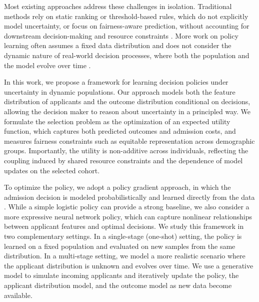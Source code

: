 \documentclass[acmlarge]{acmart-ecaf}
\begin{document}
Most existing approaches address these challenges in isolation. Traditional methods rely on static ranking or threshold-based rules, which do not explicitly model uncertainty, or focus on fairness-aware prediction, without accounting for downstream decision-making and resource constraints \cite{garnett2010bayesian, kleinberg2018algorithmic}. More work on policy learning often assumes a fixed data distribution and does not consider the dynamic nature of real-world decision processes, where both the population and the model evolve over time \cite{ athey2021policy, kleine2022meritocracy,gupta1958selecting}.

In this work, we propose a framework for learning decision policies under uncertainty in dynamic populations. Our approach models both the feature distribution of applicants and the outcome distribution conditional on decisions, allowing the decision maker to reason about uncertainty in a principled way. We formulate the selection problem as the optimization of an expected utility function, which captures both predicted outcomes and admission costs, and measures fairness constraints such as equitable representation across demographic groups. Importantly, the utility is non-additive across individuals, reflecting the coupling induced by shared resource constraints and the dependence of model updates on the selected cohort.

To optimize the policy, we adopt a policy gradient approach, in which the admission decision is modeled probabilistically and learned directly from the data \cite{wu2023predictive}. While a simple logistic policy can provide a strong baseline, we also consider a more expressive neural network policy, which can capture nonlinear relationships between applicant features and optimal decisions. We study this framework in two complementary settings. In a single-stage (one-shot) setting, the policy is learned on a fixed population and evaluated on new samples from the same distribution. In a multi-stage setting, we model a more realistic scenario where the applicant distribution is unknown and evolves over time. We use a generative model to simulate incoming applicants and iteratively update the policy, the applicant distribution model, and the outcome model as new data become available.
\end{document}
